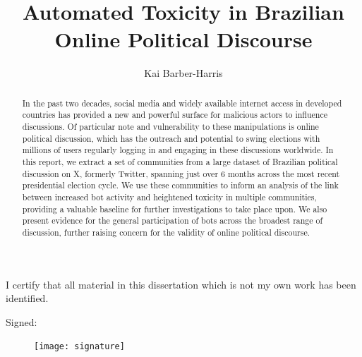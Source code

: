 \documentclass[a4paper,11pt]{article}  %
\title{Automated Toxicity in Brazilian Online Political Discourse}
\author{Kai Barber-Harris}
\begin{document}
	
	\maketitle
	\vspace{5cm}
	\begin{abstract}
		In the past two decades, social media and widely available internet access in developed countries has provided a new and powerful surface for malicious actors to influence discussions. Of particular note and vulnerability to these manipulations is online political discussion, which has the outreach and potential to swing elections with millions of users regularly logging in and engaging in these discussions worldwide. In this report, we extract a set of communities from a large dataset of Brazilian political discussion on X, formerly Twitter, spanning just over 6 months across the most recent presidential election cycle. We use these communities to inform an analysis of the link between increased bot activity and heightened toxicity in multiple communities, providing a valuable baseline for further investigations to take place upon. We also present evidence for the general participation of bots across the broadest range of discussion, further raising concern for the validity of online political discourse.
	\end{abstract}
	
	\vfill
	
	\begin{center}
		I certify that all material in this dissertation which is not my own work has been identified.
	\end{center}

	Signed: 
	
	\begin{figure}
		\hspace*{2cm} \texttt{[image: signature]}
		\label{fig:signature}
	\end{figure}
	
	\newpage
	
	\tableofcontents
	
	\newpage
\end{document}
